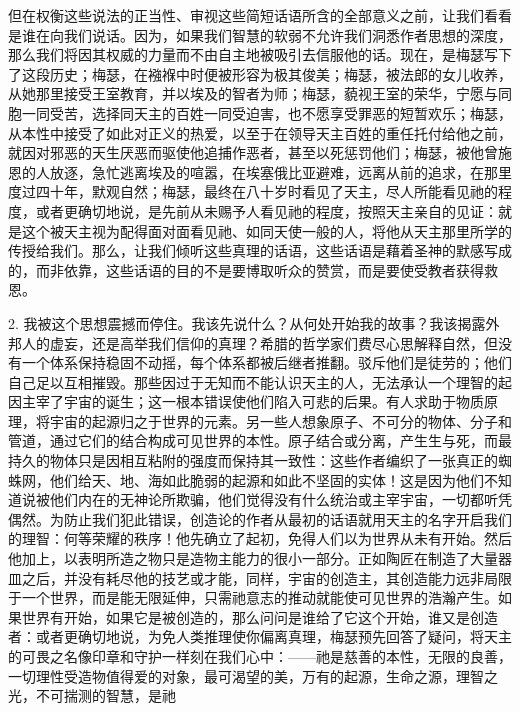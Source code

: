 但在权衡这些说法的正当性、审视这些简短话语所含的全部意义之前，让我们看看是谁在向我们说话。因为，如果我们智慧的软弱不允许我们洞悉作者思想的深度，那么我们将因其权威的力量而不由自主地被吸引去信服他的话。现在，是梅瑟写下了这段历史；梅瑟，在襁褓中时便被形容为极其俊美；梅瑟，被法郎的女儿收养，从她那里接受王室教育，并以埃及的智者为师；梅瑟，藐视王室的荣华，宁愿与同胞一同受苦，选择同天主的百姓一同受迫害，也不愿享受罪恶的短暂欢乐；梅瑟，从本性中接受了如此对正义的热爱，以至于在领导天主百姓的重任托付给他之前，就因对邪恶的天生厌恶而驱使他追捕作恶者，甚至以死惩罚他们；梅瑟，被他曾施恩的人放逐，急忙逃离埃及的喧嚣，在埃塞俄比亚避难，远离从前的追求，在那里度过四十年，默观自然；梅瑟，最终在八十岁时看见了天主，尽人所能看见祂的程度，或者更确切地说，是先前从未赐予人看见祂的程度，按照天主亲自的见证：就是这个被天主视为配得面对面看见祂、如同天使一般的人，将他从天主那里所学的传授给我们。那么，让我们倾听这些真理的话语，这些话语是藉着圣神的默感写成的，而非依靠，这些话语的目的不是要博取听众的赞赏，而是要使受教者获得救恩。\par

2. 我被这个思想震撼而停住。我该先说什么？从何处开始我的故事？我该揭露外邦人的虚妄，还是高举我们信仰的真理？希腊的哲学家们费尽心思解释自然，但没有一个体系保持稳固不动摇，每个体系都被后继者推翻。驳斥他们是徒劳的；他们自己足以互相摧毁。那些因过于无知而不能认识天主的人，无法承认一个理智的起因主宰了宇宙的诞生；这一根本错误使他们陷入可悲的后果。有人求助于物质原理，将宇宙的起源归之于世界的元素。另一些人想象原子、不可分的物体、分子和管道，通过它们的结合构成可见世界的本性。原子结合或分离，产生生与死，而最持久的物体只是因相互粘附的强度而保持其一致性：这些作者编织了一张真正的蜘蛛网，他们给天、地、海如此脆弱的起源和如此不坚固的实体！这是因为他们不知道说被他们内在的无神论所欺骗，他们觉得没有什么统治或主宰宇宙，一切都听凭偶然。为防止我们犯此错误，创造论的作者从最初的话语就用天主的名字开启我们的理智：何等荣耀的秩序！他先确立了起初，免得人们以为世界从未有开始。然后他加上，以表明所造之物只是造物主能力的很小一部分。正如陶匠在制造了大量器皿之后，并没有耗尽他的技艺或才能，同样，宇宙的创造主，其创造能力远非局限于一个世界，而是能无限延伸，只需祂意志的推动就能使可见世界的浩瀚产生。如果世界有开始，如果它是被创造的，那么问问是谁给了它这个开始，谁又是创造者：或者更确切地说，为免人类推理使你偏离真理，梅瑟预先回答了疑问，将天主的可畏之名像印章和守护一样刻在我们心中：——祂是慈善的本性，无限的良善，一切理性受造物值得爱的对象，最可渴望的美，万有的起源，生命之源，理智之光，不可揣测的智慧，是祂\par

